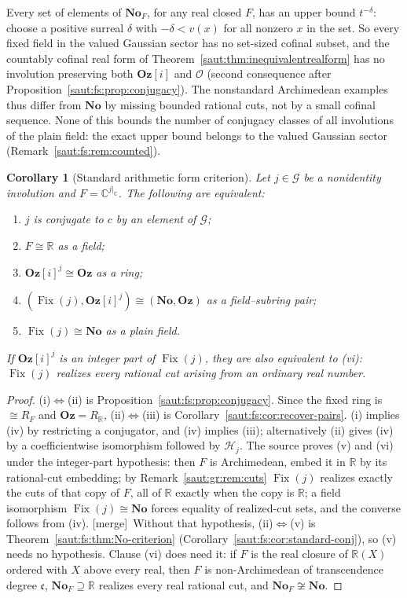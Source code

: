 \documentclass[11pt]{article}
\newtheorem{corollary}[theorem]{Corollary}
\theoremstyle{definition}
\theoremstyle{remark}
\newcommand{\No}{\mathbf{No}}
\newcommand{\R}{\mathbb R}
\newcommand{\C}{\mathbb C}
\newcommand{\OO}{\mathcal O}
\newcommand{\Fix}{\operatorname{Fix}}
\newcommand{\Oz}{\mathbf{Oz}}
\newcommand{\cc}{\mathfrak c}
\newcommand{\mergetag}{\textup{[merge]}}
\numberwithin{equation}{section}
\begin{document}
Every set of elements of $\No_F$, for any real closed $F$, has an upper bound
$t^{-\delta}$: choose a positive surreal $\delta$ with $-\delta<v(x)$ for all nonzero
$x$ in the set. So every fixed field in the valued Gaussian sector has no set-sized
cofinal subset, and the countably cofinal real form of
Theorem~\ref{saut:thm:inequivalentrealform} has no involution preserving both $\Oz[i]$
and $\OO$ (second consequence after Proposition~\ref{saut:fs:prop:conjugacy}). The
nonstandard Archimedean examples thus differ from $\No$ by missing bounded rational
cuts, not by a small cofinal sequence. None of this bounds the number of conjugacy
classes of all involutions of the plain field: the exact upper bound belongs to the
valued Gaussian sector (Remark~\ref{saut:fs:rem:counted}).

\begin{corollary}[Standard arithmetic form criterion]\label{saut:gr:cor:standard}
Let $j\in\mathcal G$ be a nonidentity involution and $F=\C^{j|_\C}$. The following are
equivalent:
\begin{enumerate}[label=\textup{(\roman*)}]
\item $j$ is conjugate to $c$ by an element of $\mathcal G$;
\item $F\cong\R$ as a field;
\item $\Oz[i]^j\cong\Oz$ as a ring;
\item $(\Fix(j),\Oz[i]^j)\cong(\No,\Oz)$ as a field--subring pair;
\item $\Fix(j)\cong\No$ as a plain field.
\end{enumerate}
If $\Oz[i]^j$ is an integer part of $\Fix(j)$, they are also equivalent to
\textup{(vi)}: $\Fix(j)$ realizes every rational cut arising from an ordinary real number.
\end{corollary}
\begin{proof}
(i)$\Leftrightarrow$(ii) is Proposition~\ref{saut:fs:prop:conjugacy}. Since the fixed
ring is $\cong R_F$ and $\Oz=R_\R$, (ii)$\Leftrightarrow$(iii) is
Corollary~\ref{saut:fs:cor:recover-pairs}. (i) implies (iv) by restricting a
conjugator, and (iv) implies (iii); alternatively (ii) gives (iv) by a coefficientwise
isomorphism followed by $\mathcal H_j$. The source proves (v) and (vi) under the
integer-part hypothesis: then $F$ is Archimedean, embed it in $\R$ by its rational-cut
embedding; by Remark~\ref{saut:gr:rem:cuts} $\Fix(j)$ realizes exactly the cuts of that
copy of $F$, all of $\R$ exactly when the copy is $\R$; a field isomorphism
$\Fix(j)\cong\No$ forces equality of realized-cut sets, and the converse follows from
(iv). \mergetag\ Without that hypothesis, (ii)$\Leftrightarrow$(v) is
Theorem~\ref{saut:fs:thm:No-criterion} (Corollary~\ref{saut:fs:cor:standard-conj}), so
(v) needs no hypothesis. Clause (vi) does need it: if $F$ is the real closure of
$\R(X)$ ordered with $X$ above every real, then $F$ is non-Archimedean of transcendence
degree $\cc$, $\No_F\supseteq\R$ realizes every real rational cut, and $\No_F\not\cong\No$.
\end{proof}
\end{document}
